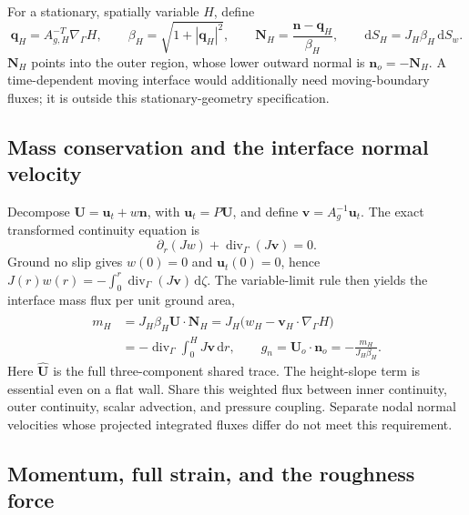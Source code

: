 \documentclass[11pt,a4paper]{article}
\numberwithin{equation}{section}
\newcommand{\dd}{\mathrm d}
\begin{document}
For a stationary, spatially variable $H$, define
\begin{equation}
 \boldsymbol q_H=A_{g,H}^{-T}\nabla_\Gamma H,
 \qquad \beta_H=\sqrt{1+|\boldsymbol q_H|^2},\qquad
 \boxed{\boldsymbol N_H=\frac{\boldsymbol n-\boldsymbol q_H}{\beta_H},
 \qquad \dd S_H=J_H\beta_H\,\dd S_w.}
 \label{geo:interface-geometry}
\end{equation}
$\boldsymbol N_H$ points into the outer region, whose lower outward
normal is $\boldsymbol n_o=-\boldsymbol N_H$.  A time-dependent
moving interface would additionally need moving-boundary fluxes;
it is outside this stationary-geometry specification.

\subsection{Mass conservation and the interface normal velocity}

Decompose $\boldsymbol U=\boldsymbol u_t+w\boldsymbol n$, with
$\boldsymbol u_t=P\boldsymbol U$, and define
$\boldsymbol v=A_g^{-1}\boldsymbol u_t$.  The exact transformed
continuity equation is
\begin{equation}
 \boxed{\partial_r(Jw)+\operatorname{div}_\Gamma(J\boldsymbol v)=0.}
 \label{geo:continuity}
\end{equation}
Ground no slip gives $w(0)=0$ and $\boldsymbol u_t(0)=0$, hence
$J(r)w(r)=-\int_0^r\operatorname{div}_\Gamma(J\boldsymbol v)\,\dd\zeta$.
The variable-limit rule then yields the interface mass flux per unit
ground area,
\begin{equation}
 \boxed{\begin{aligned}
 m_H&=J_H\beta_H\widehat{\boldsymbol U}\cdot\boldsymbol N_H
     =J_H\bigl(w_H-\boldsymbol v_H\cdot\nabla_\Gamma H\bigr)\\
    &=-\operatorname{div}_\Gamma\int_0^H J\boldsymbol v\,\dd r,
 \qquad
 g_n=\boldsymbol U_o\cdot\boldsymbol n_o
     =-\frac{m_H}{J_H\beta_H} .
 \end{aligned}}
 \label{geo:massflux}
\end{equation}
Here $\widehat{\boldsymbol U}$ is the full three-component shared
trace.  The height-slope term is essential even on a flat wall.
Share this weighted flux between inner continuity, outer continuity,
scalar advection, and pressure coupling.  Separate nodal normal
velocities whose projected integrated fluxes differ do not meet
this requirement.

\subsection{Momentum, full strain, and the roughness force}
\end{document}
